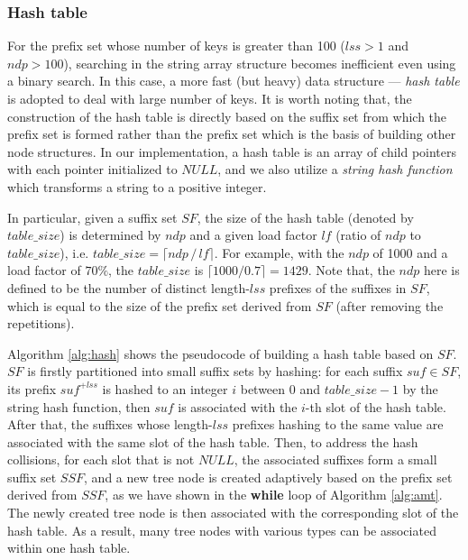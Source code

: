 \documentclass{article}
\begin{document}
\subsubsection{Hash table}
\label{sec:hash table}

For the prefix set whose number of keys is greater than 100 ($lss > 1$
and $ndp > 100$), searching in the string array structure becomes
inefficient even using a binary search. In this case, a more fast (but
heavy) data structure --- \emph{hash table} is adopted to deal with
large number of keys. It is worth noting that, the construction of the
hash table is directly based on the suffix set from which the prefix
set is formed rather than the prefix set which is the basis of
building other node structures. In our implementation, a hash table is
an array of child pointers with each pointer initialized to $NULL$,
and we also utilize a \emph{string hash function} which transforms a
string to a positive integer.


In particular, given a suffix set $SF$, the size of the hash table
(denoted by $table\_size$) is determined by $ndp$ and a given load
factor $lf$ (ratio of $ndp$ to $table\_size$), i.e.
$table\_size = \lceil ndp\,/\,lf \rceil$. For example, with the $ndp$
of 1000 and a load factor of $70\%$, the $table\_size$ is
$\lceil 1000/0.7 \rceil = 1429$. Note that, the $ndp$ here is defined
to be the number of distinct length-$lss$ prefixes of the suffixes in
$SF$, which is equal to the size of the prefix set derived from $SF$
(after removing the repetitions).

Algorithm \ref{alg:hash} shows the pseudocode of building a hash table
based on $SF$. $SF$ is firstly partitioned into small suffix sets by
hashing: for each suffix $suf \in SF$, its prefix $suf^{+lss}$ is
hashed to an integer $i$ between 0 and $table\_size-1$ by the string
hash function, then $suf$ is associated with the $i$-th slot of the
hash table. After that, the suffixes whose length-$lss$ prefixes
hashing to the same value are associated with the same slot of the
hash table. Then, to address the hash collisions, for each slot that
is not $NULL$, the associated suffixes form a small suffix set $SSF$,
and a new tree node is created adaptively based on the prefix set
derived from $SSF$, as we have shown in the \textbf{while} loop of
Algorithm \ref{alg:amt}. The newly created tree node is then
associated with the corresponding slot of the hash table. As a result,
many tree nodes with various types can be associated within one hash
table.
\end{document}
